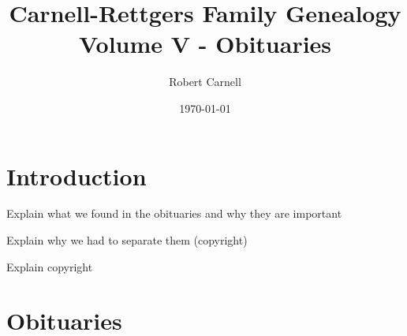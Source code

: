 \documentclass[11pt,letter]{book}
\title{\bf Carnell-Rettgers Family Genealogy \\
       \large Volume V - Obituaries}
\author{Robert Carnell}
\date{\today}
\begin{document}
\frontmatter
\maketitle
\tableofcontents
\mainmatter


\chapter{Introduction}

Explain what we found in the obituaries and why they are important

Explain why we had to separate them (copyright)

Explain copyright

\chapter{Obituaries}
\renewcommand{\thesection}{\arabic{section}}


\end{document}
